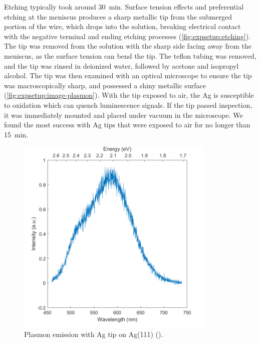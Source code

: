 Etching typically took around \SI{30}{min}. Surface tension effects and preferential etching at the meniscus produces a sharp metallic tip from the submerged portion of the wire, which drops into the solution, breaking electrical contact with the negative terminal and ending etching processes (\autoref{fig:expsetup:etching}). The tip was removed from the solution with the sharp side facing away from the meniscus, as the surface tension can bend the tip. The teflon tubing was removed, and the tip was rinsed in deionized water, followed by acetone and isopropyl alcohol. The tip was then examined with an optical microscope to ensure the tip was macroscopically sharp, and possessed a shiny metallic surface (\autoref{fig:expsetup:image-plasmon}). With the tip exposed to air, the Ag is susceptible to oxidation which can quench luminescence signals. If the tip passed inspection, it was immediately mounted and placed under vacuum in the microscope. We found the most success with Ag tips that were exposed to air for no longer than \SI{15}{min}.

\begin{figure}[H]
    \centering
    
    \includegraphics[width=0.85\textwidth]{pictures/ag111_plasmon.png}
    \caption{Plasmon emission with Ag tip on Ag(111) ().}
    
    \label{fig:expsetup:plasmon}
\end{figure}

